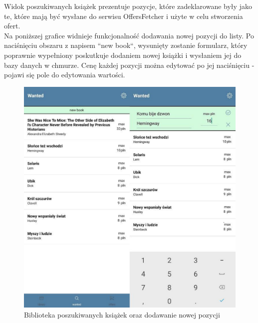 \newpage
Widok poszukiwanych książek prezentuje pozycje, które zadeklarowane były jako te, które mają być wysłane do serwisu OffersFetcher i użyte w celu stworzenia ofert.\\
Na poniższej grafice widnieje funkcjonalność dodawania nowej pozycji do listy. Po naciśnięciu  obszaru z napisem ``new book``, wysunięty zostanie formularz, który poprawnie wypełniony poskutkuje dodaniem nowej książki i wysłaniem jej do bazy danych w chmurze. Cenę każdej pozycji można edytować po jej naciśnięciu - pojawi się pole do edytowania wartości.
\begin{figure}[H]
	\centering
	\includegraphics[width=\linewidth]{wanted.pdf}
	\caption{Biblioteka poszukiwanych książek oraz dodawanie nowej pozycji}
\end{figure}
\newpage

